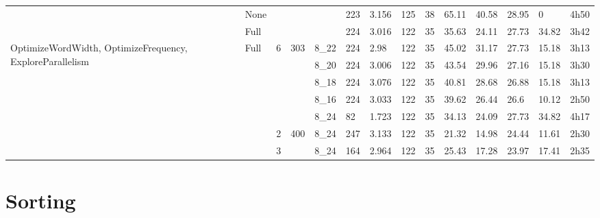 \begin{table}
\begin{tabularx}{\textwidth}{p{3.5cm}|X|X|X|X|X|X|X|X|X|X|X|X|X|}
            & None        &     &          &       & 223             & 3.156          & 125                & 38                & 65.11    & 40.58  & 28.95     & 0        & 4h50       \\
            & Full        &     &          &       & 224             & 3.016          &	122                & 35                & 35.63    & 24.11  & 27.73     & 34.82    & 3h42       \\
            \hline
    \multirow{5}{2cm}{OptimizeWordWidth, OptimizeFrequency, ExploreParallelism}        & Full        & 6   & 303      & 8\_22 & 224             & 2.98           & 122                & 35                & 45.02    & 31.17  & 27.73     & 15.18    & 3h13       \\
            &             &     &          & 8\_20 & 224             & 3.006          &	122                & 35                & 43.54    & 29.96  & 27.16     & 15.18    & 3h30       \\
            &             &     &          & 8\_18 & 224             & 3.076          & 122                & 35                & 40.81    & 28.68  & 26.88     & 15.18    & 3h13       \\
            &             &     &          & 8\_16 & 224             & 3.033          & 122                & 35                & 39.62    & 26.44  & 26.6      & 10.12    & 2h50       \\
            &             &     &          & 8\_24 & 82              & 1.723          & 122                & 35                & 34.13    & 24.09  & 27.73     & 34.82    & 4h17       \\
            \hline
            &             & 2   & 400      & 8\_24 & 247             & 3.133          &	122                & 35                & 21.32    & 14.98  & 24.44     & 11.61    & 2h30       \\
            &             & 3   &          & 8\_24 & 164             & 2.964          & 122                & 35                & 25.43    & 17.28  & 23.97     & 17.41    & 2h35       \\

  \end{tabularx}
\end{table}






\section{Sorting}



